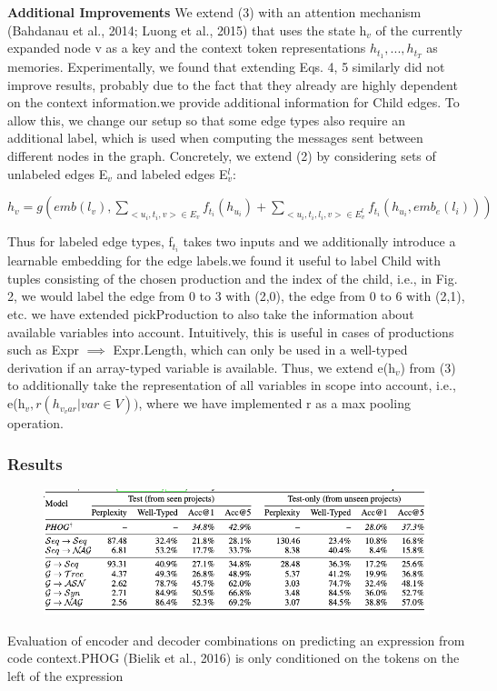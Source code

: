 \documentclass{article}
\begin{document}
\textbf{Additional Improvements} We extend (3) with an attention mechanism (Bahdanau et al., 2014; Luong et al., 2015) that uses the state h$_v$ of the currently expanded node v as a key and the context token representations $h_{t_1} , . . . , h_{t_T}$ as memories. Experimentally, we found that extending Eqs. 4, 5 similarly did not improve results, probably due to the fact that they already are highly dependent on the context information.we provide additional information for Child edges. To allow this, we change our setup so that some edge types also require an additional label, which is used when computing the messages sent between different nodes in the graph. Concretely, we extend (2) by considering sets of unlabeled edges E$_v$ and labeled edges E$_v^l$:

\begin{math}
h_v = g(emb(l_v), \sum_{<u_i,t_i,v>\in E_v} f_{t_i} (h_{u_i}) + \sum_{<u_i,t_i,l_i,v>\in E_v^l} f_{t_i} (h_{u_i},emb_e(l_i)))
\end{math}

Thus for labeled edge types, f$_{t_i}$ takes two inputs and we additionally introduce a learnable embedding for the edge labels.we found it useful to label Child with tuples consisting of the chosen production and the index of the child, i.e., in Fig. 2, we would label the edge from 0 to 3 with (2,0), the edge from 0 to 6 with (2,1), etc. we have extended pickProduction to also take the information about available variables into account. Intuitively, this is useful in cases of productions such as Expr $\implies$ Expr.Length, which can only be used in a well-typed derivation if an array-typed variable is available. Thus, we extend e(h$_v$) from (3) to additionally take the representation of all variables in scope into account, i.e., e(h$_v,r({h_{v_var} | var \in V}))$, where we have implemented r as a max pooling operation.
\subsubsection{Results}
\begin{figure}[ht]
\vskip 0.2in
\begin{center}
\centerline{\includegraphics[width=\columnwidth]{Images/Synthesis2-3.png}}
\label{icml-historical}
\end{center}
\vskip -0.2in
\end{figure}
Evaluation of encoder and decoder combinations on predicting an expression from code context.PHOG (Bielik et al., 2016) is only conditioned on the tokens on the left of the expression
\end{document}
